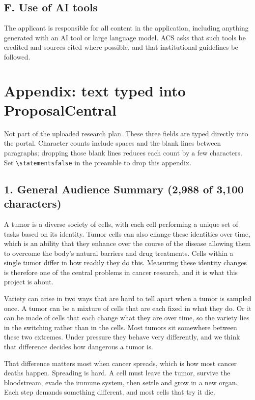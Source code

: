 \documentclass[12pt,letterpaper]{article}
\newif\ifstatements
\begin{document}
\subsection*{F. Use of AI tools}

The applicant is responsible for all content in the application, including
anything generated with an AI tool or large language model. ACS asks that such
tools be credited and sources cited where possible, and that institutional
guidelines be followed.
\fi

\ifstatements
\clearpage
\section*{Appendix: text typed into ProposalCentral}
\small

Not part of the uploaded research plan. These three fields are typed directly
into the portal. Character counts include spaces and the blank lines between
paragraphs; dropping those blank lines reduces each count by a few characters.
Set \texttt{\textbackslash statementsfalse} in the preamble to drop this appendix.

\subsection*{1. General Audience Summary (2,988 of 3,100 characters)}

A tumor is a diverse society of cells, with each cell performing a unique set of tasks based on its identity. Tumor cells can also change these identities over time, which is an ability that they enhance over the course of the disease allowing them to overcome the body's natural barriers and drug treatments. Cells within a single tumor differ in how readily they do this. Measuring these identity changes is therefore one of the central problems in cancer research, and it is what this project is about.

Variety can arise in two ways that are hard to tell apart when a tumor is sampled once. A tumor can be a mixture of cells that are each fixed in what they do. Or it can be made of cells that each change what they are over time, so the variety lies in the switching rather than in the cells. Most tumors sit somewhere between these two extremes. Under pressure they behave very differently, and we think that difference decides how dangerous a tumor is.

That difference matters most when cancer spreads, which is how most cancer deaths happen. Spreading is hard. A cell must leave the tumor, survive the bloodstream, evade the immune system, then settle and grow in a new organ. Each step demands something different, and most cells that try it die.
\end{document}
